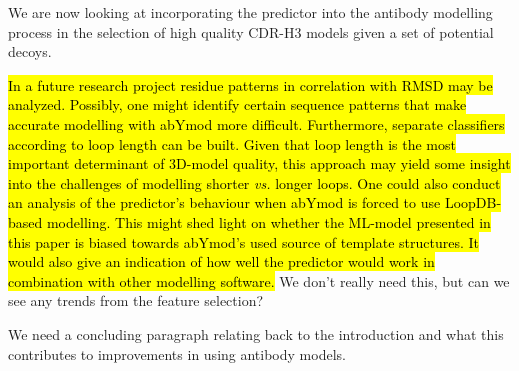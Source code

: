 \documentclass[12pt]{article}
\newcommand{\lilian}[1]{ {\color{red}{\bfseries Lilian:} #1}}
\newcommand{\highlight}[1]{\hl{#1}}
\begin{document}
We are now looking at incorporating the predictor into the antibody
modelling process in the selection of high quality CDR-H3 models given
a set of potential decoys.

\highlight{In a future research project residue patterns in correlation with RMSD
may be analyzed. Possibly, one might identify certain sequence
patterns that make accurate modelling with abYmod more
difficult. Furthermore, separate classifiers according to loop length
can be built. Given that loop length is the most important determinant
of 3D-model quality, this approach may yield some insight into the
challenges of modelling shorter \emph{vs.} longer loops.
One could also conduct an analysis of the predictor's behaviour when
abYmod is forced to use LoopDB-based modelling. This might shed light
on whether the ML-model presented in this paper is biased towards
abYmod's used source of template structures. It would also give an
indication of how well the predictor would work in combination with
other modelling software.}\lilian{We don't really need this, but can we see any trends from the feature selection?}

\lilian{We need a concluding paragraph relating back to the
  introduction and what this contributes to improvements in using
  antibody models.}


\end{document}
